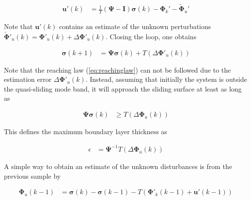 \documentclass{ifacconf}
\providecommand{\mbf}[1]{\mathbf{#1}}
\newcommand{\idxSample}{{\ensuremath{k}}}
\begin{document}
\begin{align}
\mbf{u}'(\idxSample) &= \frac{1}{T}(\mbf{\Psi} - \mbf{I})\mbf{\sigma}(\idxSample) - \mbf{\Phi}_k' - \tilde{\mbf{\Phi}}_u'
\end{align}

Note that $\mbf{u}'(\idxSample)$ contains an estimate of the unknown perturbations $\tilde{\mbf{\Phi}}'_u(\idxSample) = \mbf{\Phi}'_u(\idxSample) + \Delta \mbf{\Phi}'_u(\idxSample)$. Closing the loop, one obtains

\begin{align}
\mbf{\sigma}(\idxSample+1) &= \mbf{\Psi} \mbf{\sigma}(\idxSample) +
T (\Delta \mbf{\Phi}'_u(\idxSample))
\end{align}

Note that the reaching law (\ref{eq:reachinglaw}) can not be followed due to the estimation error $\Delta \mbf{\Phi}'_u(\idxSample)$. Instead, assuming that initially the system is outside the quasi-sliding mode band, it will approach the sliding surface at least as long as

\begin{align}
\mbf{\Psi} \mbf{\sigma}(\idxSample) & \geq T (\Delta \mbf{\Phi}_u(\idxSample))
\end{align}

This defines the maximum boundary layer thickness as

\begin{align}
\epsilon &=
\mbf{\Psi}^{-1} T (\Delta \mbf{\Phi}_u(\idxSample))
\label{eq:achievableepsilon}
\end{align}

%
%
%



A simple way to obtain an estimate of the unknown disturbances is from the previous sample by

\begin{align}
\mbf{\Phi}_u(\idxSample-1) &=
\mbf{\sigma}(\idxSample)
-
\mbf{\sigma}(\idxSample-1)
-
T
(\mbf{\Phi}'_k(\idxSample-1) + \mbf{u}'(\idxSample-1))
\end{align}
\end{document}
